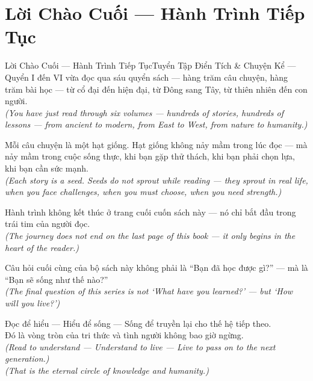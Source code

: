 \section{Lời Chào Cuối --- Hành Trình Tiếp Tục}
\begin{truyen}{Lời Chào Cuối --- Hành Trình Tiếp Tục}{Tuyển Tập Điển Tích \& Chuyện Kể --- Quyển I đến VI}
 vừa đọc qua sáu quyển sách --- hàng trăm câu chuyện, hàng trăm bài học --- từ cổ đại đến hiện đại, từ Đông sang Tây, từ thiên nhiên đến con người.\\[4pt]
\textit{(You have just read through six volumes --- hundreds of stories, hundreds of lessons --- from ancient to modern, from East to West, from nature to humanity.)}

Mỗi câu chuyện là một hạt giống. Hạt giống không nảy mầm trong lúc đọc --- mà nảy mầm trong cuộc sống thực, khi bạn gặp thử thách, khi bạn phải chọn lựa, khi bạn cần sức mạnh.\\[4pt]
\textit{(Each story is a seed. Seeds do not sprout while reading --- they sprout in real life, when you face challenges, when you must choose, when you need strength.)}

Hành trình không kết thúc ở trang cuối cuốn sách này --- nó chỉ bắt đầu trong trái tim của người đọc.\\[4pt]
\textit{(The journey does not end on the last page of this book --- it only begins in the heart of the reader.)}

Câu hỏi cuối cùng của bộ sách này không phải là ``Bạn đã học được gì?'' --- mà là ``Bạn sẽ sống như thế nào?''\\[4pt]
\textit{(The final question of this series is not `What have you learned?' --- but `How will you live?')}

\end{truyen}
\begin{baihoc}
  Đọc để hiểu --- Hiểu để sống --- Sống để truyền lại cho thế hệ tiếp theo.\\[4pt]
  Đó là vòng tròn của tri thức và tình người không bao giờ ngừng.\\[8pt]
  \textit{(Read to understand --- Understand to live --- Live to pass on to the next generation.)}\\
  \textit{(That is the eternal circle of knowledge and humanity.)}
\end{baihoc}
